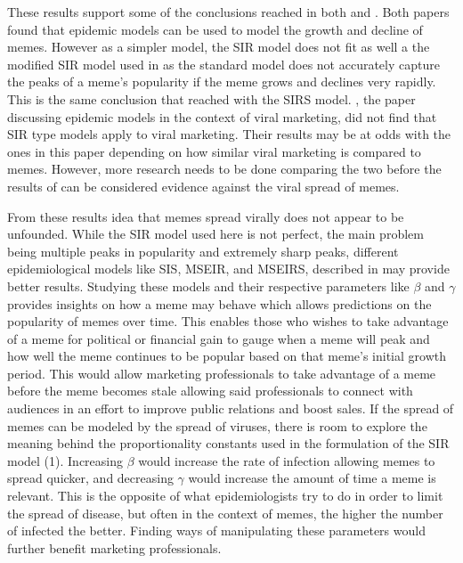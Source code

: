 \documentclass[12pt, letterpaper]{article}
\begin{document}
These results support some of the conclusions reached in both \cite{bauckhage2011insights} and \cite{wang2011epidemiological}. Both papers found that epidemic models can be used to model the growth and decline of memes. However as a simpler model, the SIR model does not fit as well a the modified SIR model used in \cite{wang2011epidemiological} as the standard model does not accurately capture the peaks of a meme's popularity if the meme grows and declines very rapidly. This is the same conclusion that \cite{bauckhage2011insights} reached with the SIRS model. \cite{leskovec2007dynamics}, the paper discussing epidemic models in the context of viral marketing, did not find that SIR type models apply to viral marketing. Their results may be at odds with the ones in this paper depending on how similar viral marketing is compared to memes. However, more research needs to be done comparing the two before the results of \cite{leskovec2007dynamics} can be considered evidence against the viral spread of memes.

From these results idea that memes spread virally does not appear to be unfounded. While the SIR model used here is not perfect, the main problem being multiple peaks in popularity and extremely sharp peaks, different epidemiological models like SIS, MSEIR, and MSEIRS, described in \cite{hethcote2000mathematics} may provide better results. Studying these models and their respective parameters like $\beta$ and $\gamma$ provides insights on how a meme may behave which allows predictions on the popularity of memes over time. This enables those who wishes to take advantage of a meme for political or financial gain to gauge when a meme will peak and how well the meme continues to be popular based on that meme's initial growth period. This would allow marketing professionals to take advantage of a meme before the meme becomes stale allowing said professionals to connect with audiences in an effort to improve public relations and boost sales. If the spread of memes can be modeled by the spread of viruses, there is room to explore the meaning behind the proportionality constants used in the formulation of the SIR model (1). Increasing $\beta$ would increase the rate of infection allowing memes to spread quicker, and decreasing $\gamma$ would increase the amount of time a meme is relevant. This is the opposite of what epidemiologists try to do in order to limit the spread of disease, but often in the context of memes, the higher the number of infected the better. Finding ways of manipulating these parameters would further benefit marketing professionals.
\end{document}
